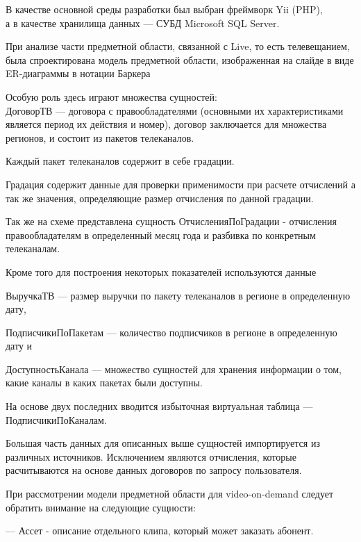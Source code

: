 \documentclass[a4paper]{article}
\begin{document}
В качестве основной среды разработки был выбран фреймворк Yii (PHP),\\
а в качестве хранилища данных --- СУБД Microsoft SQL Server.\\

\newpage

При анализе части предметной области, связанной с Live, то есть телевещанием, была спроектирована модель предметной области, изображенная на слайде в виде
ER-диаграммы в нотации Баркера

Особую роль здесь играют множества сущностей:\\

ДоговорТВ --- договора с правообладателями (основными их характеристиками является период их действия и номер), договор заключается  
для множества регионов, и состоит из пакетов телеканалов.

Каждый пакет телеканалов содержит в себе градации.

Градация содержит данные для проверки применимости при расчете отчислений а так же значения, определяющие размер отчисления по данной градации.

Так же на схеме представлена сущность ОтчисленияПоГрадации - отчисления правообладателям
 в определенный месяц года и разбивка по конкретным телеканалам.

\newpage

Кроме того для построения некоторых показателей используются данные 

ВыручкаТВ --- размер выручки по пакету телеканалов в регионе в определенную дату, 

ПодписчикиПоПакетам --- количество подписчиков в регионе в определенную дату и 

ДоступностьКанала
 --- множество сущностей для хранения информации о том, какие каналы в каких пакетах были доступны.

На основе двух последних вводится избыточная виртуальная таблица --- ПодписчикиПоКаналам.

Большая часть данных для описанных выше сущностей импортируется из различных источников.
Исключением являются отчисления, которые расчитываются на основе данных договоров по запросу пользователя.

\newpage

При рассмотрении модели предметной области для video-on-demand следует обратить внимание на следующие сущности:

--- Ассет - описание отдельного клипа, который может заказать абонент.
\end{document}
